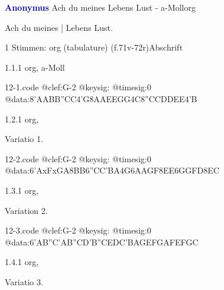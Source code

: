 \documentclass[twocolumn]{book}
\begin{document}
\par \vspace{7pt} \textcolor{darkblue}{\textbf{Anonymus  }}\hfillplus{\textbf{[12]}}\newline Ach du meines Lebens Lust - a-Moll\newline org
\par \begin{itshape}[f.78v, at left:] Ach du meines | Lebens Lust.\end{itshape} 
\par \textcolor{darkblue}{}  1 Stimmen: org (tabulature)  (f.71v-72r)\newline Abschrift
\par 1.1.1  org, a-Moll  
\begin{filecontents*}{12-1.code}
@clef:G-2
@keysig:
@timesig:0
@data:{8'AABB}{''CC}4'G{8AAEE}{GG}4C{8''CCDD}{EE}4'B
\end{filecontents*}
\newline
%
\par 1.2.1  org, \begin{itshape}Variatio 1.\end{itshape}  
\begin{filecontents*}{12-2.code}
@clef:G-2
@keysig:
@timesig:0
@data:{6'AxFxGA}{8BB}{6''CC'BA}4G{6AAGF}{8EE}{6GGFD}{8EC}
\end{filecontents*}
\newline
%
\par 1.3.1  org, \begin{itshape}Variation 2.\end{itshape}  
\begin{filecontents*}{12-3.code}
@clef:G-2
@keysig:
@timesig:0
@data:{6'AB''C'A}{B''CD'B}{''CEDC}{'BAGE}{FGAF}{EFGC}
\end{filecontents*}
\newline
%
\par 1.4.1  org, \begin{itshape}Variatio 3.\end{itshape}  
\end{document}
